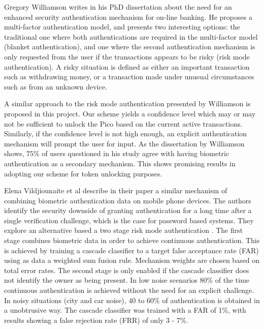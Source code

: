 Gregory Williamson writes in his PhD dissertation \cite{williamson2006enhanced} about the need for an enhanced security authentication mechanism for on-line banking. He proposes a multi-factor authentication model, and presents two interesting options: the traditional one where both authentications are required in the multi-factor model (blanket authentication), and one where the second authentication mechanism is only requested from the user if the transactions appears to be risky (risk mode authentication). A risky situation is defined as either an important transaction such as withdrawing money, or a transaction made under unusual circumstances such as from an unknown device. 

A similar approach to the risk mode authentication presented by Williamson \cite{williamson2006enhanced} is proposed in this project. Our scheme yields a confidence level which may or may not be sufficient to unlock the Pico based on the current active transactions. Similarly, if the confidence level is not high enough, an explicit authentication mechanism will prompt the user for input. As the dissertation by Williamson shows, $75\%$ of users questioned in his study agree with having biometric authentication as a secondary mechanism. This shows promising results in adopting our scheme for token unlocking purposes.

Elena Vildjiounaite et al describe in their paper \cite{vildjiounaite2007increasing} a similar mechanism of combining biometric authentication data on mobile phone devices. The authors identify the security downside of granting authentication for a long time after a single verification challenge, which is the case for password based systems. They explore an alternative based a two stage risk mode authentication \cite{williamson2006enhanced}. The first stage combines biometric data in order to achieve continuous authentication. This is achieved by training a cascade classifier to a target false acceptance rate (FAR) using as data a weighted sum fusion rule. Mechanism weights are chosen based on total error rates. The second stage is only enabled if the cascade classifier does not identify the owner as being present. In low noise scenarios 80\% of the time continuous authentication is achieved without the need for an explicit challenge. In noisy situations (city and car noise), 40 to 60\% of authentication is obtained in a unobtrusive way. The cascade classifier was trained with a FAR of 1\%, with results showing a false rejection rate (FRR) of only 3 - 7\%.

